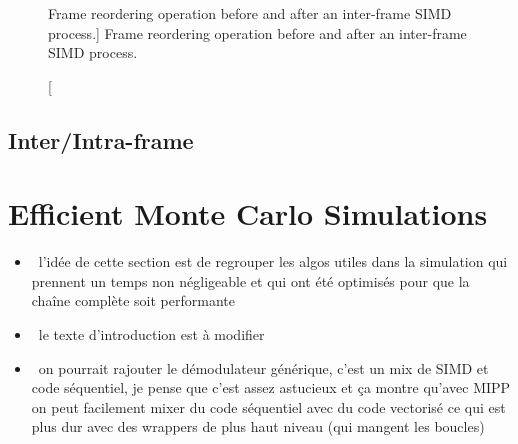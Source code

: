 \begin{figure}[htp]
  \caption
    [Frame reordering operation before and after an inter-frame SIMD process.]
    {Frame reordering operation before and after an inter-frame SIMD process.}
  \label{fig:vec_reordering_process_inter_simd}
\end{figure}

\subsection{Inter/Intra-frame}

\section{Efficient Monte Carlo Simulations}

\begin{itemize}
  \item \cmark~l'idée de cette section est de regrouper les algos utiles dans la
    simulation qui prennent un temps non négligeable et qui ont été optimisés
    pour que la chaîne complète soit performante
  \item \xmark~le texte d'introduction est à modifier
  \item \xmark~on pourrait rajouter le démodulateur générique, c'est un mix de
    SIMD et code séquentiel, je pense que c'est assez astucieux et ça montre
    qu'avec MIPP on peut facilement mixer du code séquentiel avec du code
    vectorisé ce qui est plus dur avec des wrappers de plus haut niveau (qui
    mangent les boucles)
\end{itemize}

